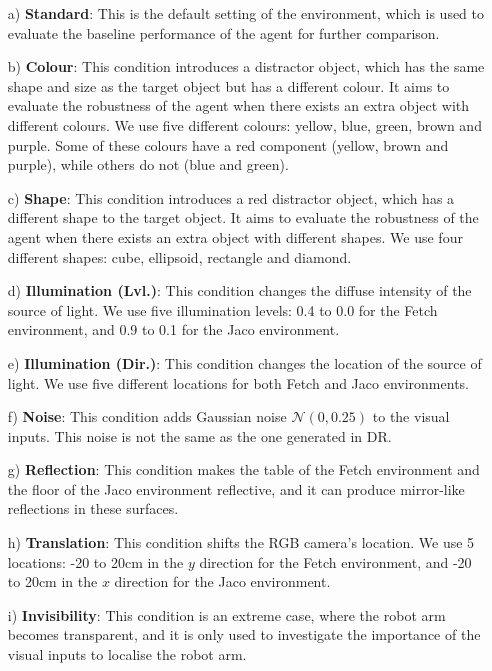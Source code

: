 \begin{enumerate}
\item[a)] \textbf{Standard}: This is the default setting of the environment, which is used to evaluate the baseline performance of the agent for further comparison. 

\item[b)] \textbf{Colour}: This condition introduces a distractor object, which has the same shape and size as the target object but has a different colour. It aims to evaluate the robustness of the agent when there exists an extra object with different colours. We use five different colours: yellow, blue, green, brown and purple. Some of these colours have a red component (yellow, brown and purple), while others do not (blue and green).

\item[c)] \textbf{Shape}: This condition introduces a red distractor object, which has a different shape to the target object. It aims to evaluate the robustness of the agent when there exists an extra object with different shapes. We use four different shapes: cube, ellipsoid, rectangle and diamond.

\item[d)] \textbf{Illumination (Lvl.)}: This condition changes the diffuse intensity of the source of light. We use five illumination levels: 0.4 to 0.0 for the Fetch environment, and 0.9 to 0.1 for the Jaco environment.

\item[e)] \textbf{Illumination (Dir.)}: This condition changes the location of the source of light. We use five different locations for both Fetch and Jaco environments.

\item[f)] \textbf{Noise}: This condition adds Gaussian noise $\mathcal{N}(0, 0.25)$ to the visual inputs. This noise is not the same as the one generated in DR.

\item[g)] \textbf{Reflection}: This condition makes the table of the Fetch environment and the floor of the Jaco environment reflective, and it can produce mirror-like reflections in these surfaces.

\item[h)] \textbf{Translation}: This condition shifts the RGB camera's location. We use 5 locations: -20 to 20cm in the $y$ direction for the Fetch environment, and -20 to 20cm in the $x$ direction for the Jaco environment.

\item[i)] \textbf{Invisibility}: This condition is an extreme case, where the robot arm becomes transparent, and it is only used to investigate the importance of the visual inputs to localise the robot arm.
\end{enumerate}

